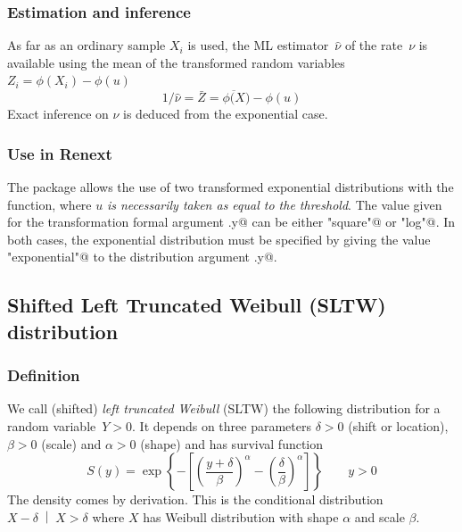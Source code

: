 \documentclass[a4paper]{report}
\newcommand{\Cond}[2]{\left. #1 \;\middle\vert\; #2 \right.}
\begin{document}
\subsubsection*{Estimation and inference}
As far as an ordinary sample $X_i$ is used, the ML  estimator~$\widehat{\nu}$ of 
the rate~$\nu$ is available  using the mean  of the transformed 
random variables~$Z_i = \phi(X_i)-\phi(u)$
$$ 
    1/\widehat{\nu} = \bar{Z} = \overline{\phi(X})-\phi(u)
$$ 
Exact inference on $\nu$ is deduced from the exponential case.

\subsubsection*{Use in Renext}
The package allows the use of two transformed exponential 
distributions with the \verb@Renouv@ function, 
where $u$ \textit{is necessarily taken as equal to
the threshold}. The value given for the  transformation formal 
argument \verb@trans.y@  can be 
either \verb@"square"@ or \verb@"log"@. 
In both cases, the exponential distribution must be specified by giving
the value \verb@"exponential"@ to the distribution argument 
\verb@distname.y@.


\subsection{Shifted Left Truncated  Weibull (SLTW) distribution}
\label{SLTW}
\subsubsection*{Definition}
We call (shifted) \textit{left truncated Weibull} (SLTW) the following 
distribution for a random variable~$Y > 0$. 
It depends  on three parameters  $\delta>0$ (shift or location), $\beta>0$ (scale) 
and $\alpha >0$ (shape) and has survival function 
\begin{equation}
  \label{eq:SLTWF}
  S(y) =  
  \exp\left\{- \left[ \left(\frac{y+\delta}{\beta} \right)^\alpha 
      -\left(\frac{\delta}{\beta}\right)^\alpha \right] \right\} 
  \qquad y > 0 
\end{equation}
The density comes by derivation.  This is the conditional distribution 
$\Cond{X-\delta}{X>\delta}$ where $X$ has Weibull distribution with shape $\alpha$ and scale 
$\beta$. 
\end{document}
